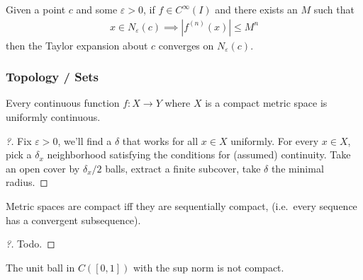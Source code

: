 \begin{proposition}

Given a point \(c\) and some \(\varepsilon>0\), if \(f \in C^\infty(I)\)
and there exists an \(M\) such that
\begin{align*}
x \in N_\varepsilon(c) \implies {\left\lvert {f^{(n)}(x)} \right\rvert} \leq M^n
\end{align*}
then the Taylor expansion about \(c\) converges on \(N_\varepsilon(c)\).

\end{proposition}

\hypertarget{topology-sets}{%
\subsubsection{Topology / Sets}\label{topology-sets}}

\begin{theorem}

Every continuous function \(f:X\to Y\) where \(X\) is a compact metric
space is uniformly continuous.

\end{theorem}

\begin{proof}[?]

Fix \({\varepsilon}>0\), we'll find a \(\delta\) that works for all
\(x\in X\) uniformly. For every \(x\in X\), pick a \(\delta_x\)
neighborhood satisfying the conditions for (assumed) continuity. Take an
open cover by \(\delta_x/2\) balls, extract a finite subcover, take
\(\delta\) the minimal radius.

\end{proof}

\begin{proposition}

Metric spaces are compact iff they are sequentially compact, (i.e.~every
sequence has a convergent subsequence).

\end{proposition}

\begin{proof}[?]

Todo. 

\end{proof}

\begin{proposition}

The unit ball in \(C([0, 1])\) with the sup norm is not compact.

\end{proposition}

